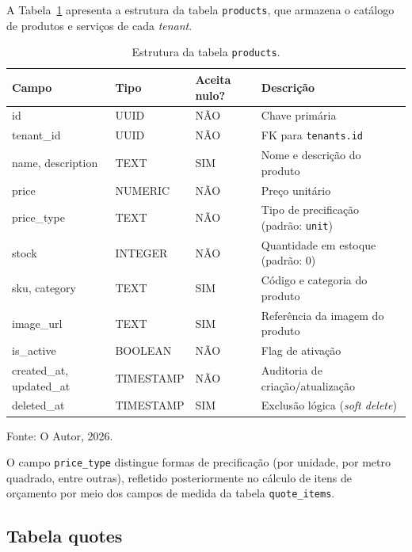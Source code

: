 A Tabela~\ref{tab:tabela-products} apresenta a estrutura da tabela \texttt{products}, que armazena o catálogo de produtos e serviços de cada \textit{tenant}.

\begin{table}[H]
  \centering
  \caption{Estrutura da tabela \texttt{products}.}
  \label{tab:tabela-products}
  \begin{tabular}{p{3.1cm}p{2.3cm}p{1.6cm}p{5.7cm}}
    \hline
    \textbf{Campo} & \textbf{Tipo} & \textbf{Aceita nulo?} & \textbf{Descrição} \\
    \hline
    id & UUID & NÃO & Chave primária \\
    tenant\_id & UUID & NÃO & FK para \texttt{tenants.id} \\
    name, description & TEXT & SIM & Nome e descrição do produto \\
    price & NUMERIC & NÃO & Preço unitário \\
    price\_type & TEXT & NÃO & Tipo de precificação (padrão: \texttt{unit}) \\
    stock & INTEGER & NÃO & Quantidade em estoque (padrão: 0) \\
    sku, category & TEXT & SIM & Código e categoria do produto \\
    image\_url & TEXT & SIM & Referência da imagem do produto \\
    is\_active & BOOLEAN & NÃO & Flag de ativação \\
    created\_at, updated\_at & TIMESTAMP & NÃO & Auditoria de criação/atualização \\
    deleted\_at & TIMESTAMP & SIM & Exclusão lógica (\textit{soft delete}) \\
    \hline
  \end{tabular}
  \begin{minipage}{0.95\textwidth}
    \vspace{0.3em}
    {\small Fonte: O Autor, 2026.}
  \end{minipage}
\end{table}

O campo \texttt{price\_type} distingue formas de precificação (por unidade, por metro quadrado, entre outras), refletido posteriormente no cálculo de itens de orçamento por meio dos campos de medida da tabela \texttt{quote\_items}.

\subsection{Tabela quotes}
\label{sec:tabela-quotes}

